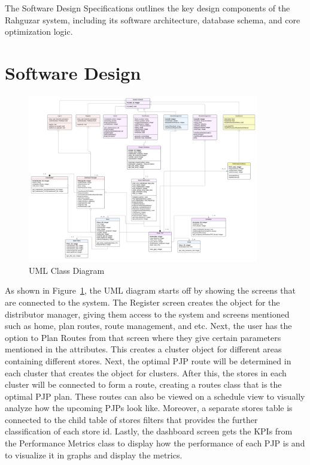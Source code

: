 The Software Design Specifications outlines the key design components of the Rahguzar system, including its software architecture, database schema, and core optimization logic.

\section{Software Design}


\begin{figure}[H]
    \centering
    \includegraphics[width=0.9\textwidth]{images/UML class f2.png} %
    \caption{UML Class Diagram}
    \label{fig:UML-image}
\end{figure}


As shown in Figure~\ref{fig:UML-image}, the UML diagram starts off by showing the screens that are connected to the system. The Register screen creates the object for the distributor manager, giving them access to the system and screens mentioned such as home, plan routes, route management, and etc. Next, the user has the option to Plan Routes from that screen where they give certain parameters mentioned in the attributes. This creates a cluster object for different areas containing different stores. Next, the optimal PJP route will be determined in each cluster that creates the object for clusters. After this, the stores in each cluster will be connected to form a route, creating a routes class that is the optimal PJP plan. These routes can also be viewed on a schedule view to visually analyze how the upcoming PJPs look like. Moreover, a separate stores table is connected to the child table of stores filters that provides the further classification of each store id. Lastly, the dashboard screen gets the KPIs from the Performance Metrics class to display how the performance of each PJP is and to visualize it in graphs and display the metrics.

